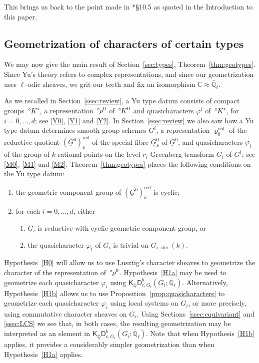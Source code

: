 \documentclass[10pt]{amsart}
\makeatletter
\theoremstyle{plain}
\theoremstyle{definition}
\newcommand{\CC}{{\mathbb{C}}}
\newcommand{\QQ}{{\mathbb{Q}}}
\newcommand{\EE}{\mathbb{\bar Q}_\ell}
\newcommand{\labitem}[2]{
\def\@itemlabel{\textbf{#1}}
\item
\def\@currentlabel{#1}\label{#2}}
\newcommand{\red}{^{\operatorname{red}}}
\newcommand{\oK}{{\,^\circ \hskip-1pt K}}
\newcommand{\orho}{{\,^\circ \hskip-1pt \rho}}
\makeatother
\begin{document}
This brings us back to the point made in \cite{Yu:models}*{\S 10.5} as quoted in the Introduction to this paper.


\subsection{Geometrization of characters of certain types}\label{ssec:geotypes}

We may now give the main result of Section~\ref{sec:types}, Theorem~\ref{thm:geotypes}.
Since Yu's theory refers to complex representations, and since our geometrization uses $\ell$-adic sheaves, we grit our teeth and fix an isomorphism $\CC \approx \EE$.


As we recalled in Section~\ref{ssec:review}, a Yu type datum consists of compact groups $\oK^i$, a representation $\orho^0$ of $\oK^0$ and quasicharacters $\varphi^i$ of $\oK^i$, for $i=0,\ldots, d$; see \ref{Y0}, \ref{Y1} and \ref{Y2}.
In Section~\ref{ssec:review} we also saw how a Yu type datum determines smooth group schemes $\underline{G}^i$, a representation $\varrho_0\red$ of the reductive quotient $(\underline{G}^0)\red_{k}$ of the special fibre $\underline{G}^0_{k}$ of $\underline{G}^0$, and quasicharacters $\varphi_i$ of the group of $k$-rational points on the level-$r_i$ Greenberg transform $G_i$ of $\underline{G}^i$; see \ref{M0}, \ref{M1} and \ref{M2}.
%
Theorem~\ref{thm:geotypes} places the following conditions on the Yu type datum:
\begin{enumerate}
\labitem{H0}{H0} the geometric component group of $(\underline{G}^0)\red_{k}$ is cyclic;
\labitem{H1}{H1} for each $i=0,\ldots, d$, either
\begin{enumerate}
\labitem{H1(a)}{H1a} $G_i$ is reductive with cyclic geometric component group, or
\labitem{H1(b)}{H1b} the quasicharacter $\varphi_i$ of $G_i$ is trivial on  $G_{i,\operatorname{der}}(k)$. 
\end{enumerate}
\end{enumerate}
Hypothesis~\ref{H0} will allow us to use Lusztig's character sheaves to geometrize the character of the representation of $\orho^0$.
Hypothesis~\ref{H1a} may be used to geometrize each quasicharacter $\varphi_i$ using $\mathsf{K}_{\bar\QQ}\mathsf{D}^b_{c,G_i}(G_i;\EE)$.
Alternatively, Hypothesis~\ref{H1b} allows us to use Proposition~\ref{prop:quasicharacters} to geometrize each quasicharacter $\varphi_i$ using local systems on $G_i$, or more precisely, using commutative character sheaves on $G_i$.
Using Sections~\ref{ssec:equivariant} and \ref{ssec:LCS} we see that, in both cases, the resulting geometrization may be interpreted as an element in $\mathsf{K}_{\bar\QQ}\mathsf{D}^b_{c,G_i}(G_i;\EE)$.
Note that when Hypothesis~\ref{H1b} applies, it provides a considerably simpler geometrization than when Hypothesis~\ref{H1a} applies.
\end{document}
